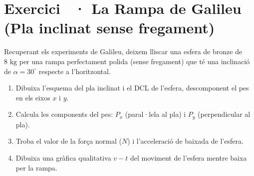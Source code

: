 \documentclass[12pt,a4paper,twoside]{article}
\newcounter{exercici}
\newcommand{\exercici}[1]{%
  \stepcounter{exercici}
  \section*{Exercici \theexercici\ \textnormal{· #1}}
  \vspace{-10pt}
}
\begin{document}
\vspace{0.5cm}
\exercici{La Rampa de Galileu (Pla inclinat sense fregament)}
Recuperant els experiments de Galileu, deixem lliscar una esfera de bronze de $8 \text{ kg}$ per una rampa perfectament polida (sense fregament) que té una inclinació de $\alpha = 30^\circ$ respecte a l'horitzontal.
\begin{enumerate}[label=\textbf{\alph*)}]
  \item Dibuixa l'esquema del pla inclinat i el DCL de l'esfera, descomponent el pes en els eixos $x$ i $y$.
  \item Calcula les components del pes: $P_x$ (paral·lela al pla) i $P_y$ (perpendicular al pla).
  \item Troba el valor de la força normal ($N$) i l'acceleració de baixada de l'esfera.
  \item Dibuixa una gràfica qualitativa $v-t$ del moviment de l'esfera mentre baixa per la rampa.
\end{enumerate}
\end{document}
